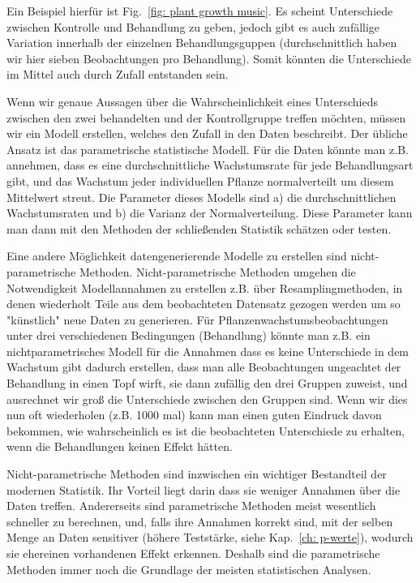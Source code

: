 \documentclass[a4paper,twoside]{tufte-book}\usepackage[]{graphicx}\usepackage[]{color}
\begin{document}
Ein Beispiel hierfür ist Fig.~\ref{fig: plant growth music}. Es scheint Unterschiede zwischen Kontrolle und Behandlung zu geben, jedoch gibt es auch zufällige Variation innerhalb der einzelnen Behandlungsguppen (durchschnittlich haben wir hier sieben Beobachtungen pro Behandlung). Somit könnten die Unterschiede im Mittel auch durch Zufall entstanden sein.

Wenn wir genaue Aussagen über die Wahrscheinlichkeit eines Unterschieds zwischen den zwei behandelten und der Kontrollgruppe treffen möchten, müssen wir ein Modell erstellen, welches den Zufall in den Daten beschreibt. Der übliche Ansatz ist das parametrische statistische Modell. Für die Daten könnte man z.B. annehmen, dass es eine durchschnittliche Wachstumsrate für jede Behandlungsart gibt, und das Wachstum jeder individuellen Pflanze normalverteilt um diesem Mittelwert streut. Die Parameter dieses Modells sind a) die durchschnittlichen Wachstumsraten und b) die Varianz der Normalverteilung. Diese Parameter kann man dann mit den Methoden der schließenden Statistik schätzen oder testen. 

Eine andere Möglichkeit datengenerierende Modelle zu erstellen sind nicht-parametrische Methoden. Nicht-parametrische Methoden umgehen die Notwendigkeit Modellannahmen zu erstellen z.B. über Resamplingmethoden, in denen wiederholt Teile aus dem beobachteten Datensatz gezogen werden um so "künstlich" neue Daten zu generieren. Für Pflanzenwachstumsbeobachtungen unter drei verschiedenen Bedingungen (Behandlung) könnte man z.B. ein nichtparametrisches Modell für die Annahmen dass es keine Unterschiede in dem Wachstum gibt dadurch erstellen, dass man alle Beobachtungen ungeachtet der Behandlung in einen Topf wirft, sie dann zufällig den drei Gruppen zuweist, und ausrechnet wir groß die Unterschiede zwischen den Gruppen sind. Wenn wir dies nun oft wiederholen (z.B. 1000 mal) kann man einen guten Eindruck davon bekommen, wie wahrscheinlich es ist die beobachteten Unterschiede zu erhalten, wenn die Behandlungen keinen Effekt hätten.

Nicht-parametrische Methoden sind inzwischen ein wichtiger Bestandteil der modernen Statistik. Ihr Vorteil liegt darin dass sie weniger Annahmen über die Daten treffen. Andererseits sind parametrische Methoden meist wesentlich schneller zu berechnen, und, falls ihre Annahmen korrekt sind, mit der selben Menge an Daten sensitiver (höhere Teststärke, siehe Kap.~\ref{ch: p-werte}), wodurch sie ehereinen vorhandenen Effekt erkennen. Deshalb sind die parametrische Methoden immer noch die Grundlage der meisten statistischen Analysen.
\end{document}
